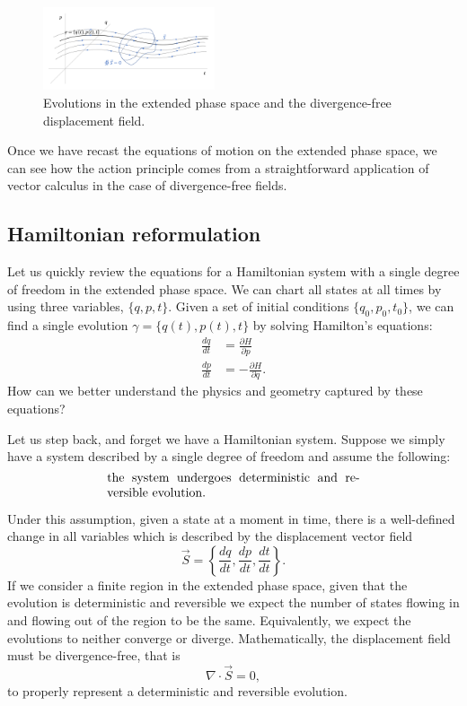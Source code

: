 \documentclass[10pt,twocolumn, nofootinbib]{revtex4-2}
\begin{document}
\begin{figure}
	\includegraphics[width = 0.45\textwidth]{ExtendedPhaseSpace}
	\caption{\footnotesize{Evolutions in the extended phase space and the divergence-free displacement field.}}\label{extended_phase_space}
\end{figure}

Once we have recast the equations of motion on the extended phase space, we can see how the action principle comes from a straightforward application of vector calculus in the case of divergence-free fields.

\subsection{Hamiltonian reformulation}

Let us quickly review the equations for a Hamiltonian system with a single degree of freedom in the extended phase space. We can chart all states at all times by using three variables, $\{q,p,t\}$. Given a set of initial conditions $\{q_0,p_0,t_0\}$, we can find a single evolution $\gamma = \{q(t), p(t), t\}$ by solving Hamilton's equations:
\begin{equation}\label{Hamilton_equations}
\begin{aligned}
	\frac{dq}{dt} &= \frac{\partial H}{\partial p} \\
	\frac{dp}{dt} &= -\frac{\partial H}{\partial q}.
\end{aligned}
\end{equation}
How can we better understand the physics and geometry captured by these equations?

Let us step back, and forget we have a Hamiltonian system. Suppose we simply have a system described by a single degree of freedom and assume the following:
\begin{align}\label{Detrev_assumptions}
	\parbox{2.8in}{the system undergoes deterministic and reversible evolution.}
\end{align}

Under this assumption, given a state at a moment in time, there is a well-defined change in all variables which is described by the displacement vector field
\begin{equation}
	\vec{S} = \left\{ \frac{dq}{dt},\frac{dp}{dt},\frac{dt}{dt} \right\}.
\end{equation}
If we consider a finite region in the extended phase space, given that the evolution is deterministic and reversible we expect the number of states flowing in and flowing out of the region to be the same. Equivalently, we expect the evolutions to neither converge or diverge. Mathematically, the displacement field must be divergence-free, that is
\begin{equation}
	\nabla \cdot \vec{S} = 0,
\end{equation}
to properly represent a deterministic and reversible evolution.
\end{document}
